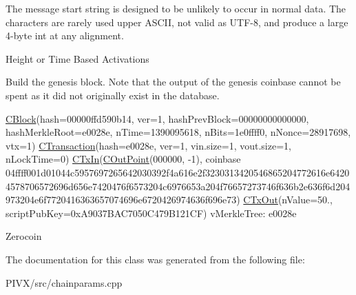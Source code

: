 The message start string is designed to be unlikely to occur in normal data. The characters are rarely used upper A\+S\+C\+II, not valid as U\+T\+F-\/8, and produce a large 4-\/byte int at any alignment.

Height or Time Based Activations ~\newline
~\newline


Build the genesis block. Note that the output of the genesis coinbase cannot be spent as it did not originally exist in the database.

\mbox{\hyperlink{class_c_block}{C\+Block}}(hash=00000ffd590b14, ver=1, hash\+Prev\+Block=00000000000000, hash\+Merkle\+Root=e0028e, n\+Time=1390095618, n\+Bits=1e0ffff0, n\+Nonce=28917698, vtx=1) \mbox{\hyperlink{class_c_transaction}{C\+Transaction}}(hash=e0028e, ver=1, vin.\+size=1, vout.\+size=1, n\+Lock\+Time=0) \mbox{\hyperlink{class_c_tx_in}{C\+Tx\+In}}(\mbox{\hyperlink{class_c_out_point}{C\+Out\+Point}}(000000, -\/1), coinbase 04ffff001d01044c5957697265642030392f4a616e2f3230313420546865204772616e64204578706572696d656e7420476f6573204c6976653a204f76657273746f636b2e636f6d204973204e6f7720416363657074696e6720426974636f696e73) \mbox{\hyperlink{class_c_tx_out}{C\+Tx\+Out}}(n\+Value=50., script\+Pub\+Key=0x\+A9037\+B\+A\+C7050\+C479\+B121\+CF) v\+Merkle\+Tree\+: e0028e

Zerocoin 

The documentation for this class was generated from the following file\+:\begin{DoxyCompactItemize}
\item 
P\+I\+V\+X/src/chainparams.\+cpp\end{DoxyCompactItemize}
